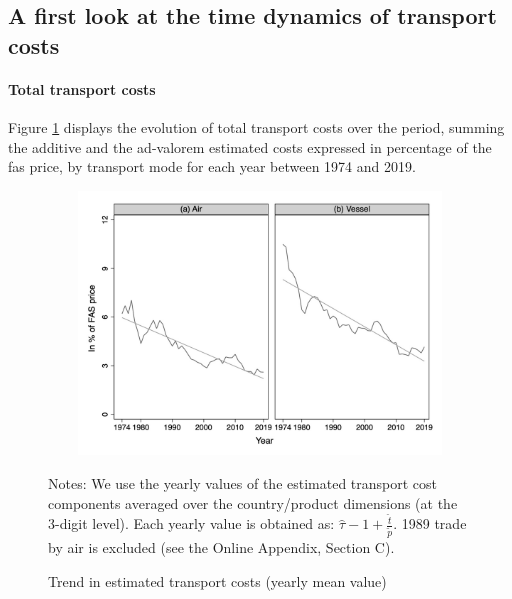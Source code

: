 \documentclass[a4paper,11pt]{article}
\begin{document}
\subsection{A first look at the time dynamics of transport costs}


\paragraph{Total transport costs} Figure \ref{fig:Trends_in_TC} displays the evolution of total transport costs over the period, summing the additive and the ad-valorem estimated costs expressed in percentage of the fas price, by transport mode for each year between 1974 and 2019.

\begin{figure}[htbp]
\caption{Trend in estimated transport costs (yearly mean value)}
\label{fig:Trends_in_TC}
\begin{center}
\includegraphics[width=14cm, height=7cm]{Figure2_Trend_of_totalTC_bymode.jpg}

\begin{minipage} [c]  {5in} \scriptsize%
Notes: We use the yearly values of the estimated transport cost components averaged over the country/product dimensions (at the 3-digit level). Each yearly value is obtained as: $\widehat{\tau}-1+\frac{\widehat{t}}{\widetilde{p}}$. 1989 trade by air is excluded (see the Online Appendix, Section C).
\end{minipage}
\end{center}
\end{figure}

\end{document}
